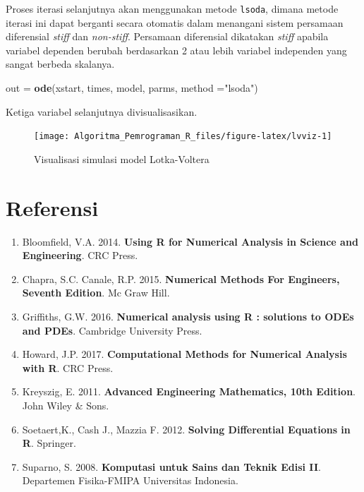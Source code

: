 \documentclass[
]{book}
\newenvironment{Shaded}{\begin{snugshade}}{\end{snugshade}}
\newcommand{\AttributeTok}[1]{\textcolor[rgb]{0.13,0.29,0.53}{#1}}
\newcommand{\FunctionTok}[1]{\textcolor[rgb]{0.13,0.29,0.53}{\textbf{#1}}}
\newcommand{\NormalTok}[1]{#1}
\newcommand{\OtherTok}[1]{\textcolor[rgb]{0.56,0.35,0.01}{#1}}
\newcommand{\StringTok}[1]{\textcolor[rgb]{0.31,0.60,0.02}{#1}}
\providecommand{\tightlist}{%
  \setlength{\itemsep}{0pt}\setlength{\parskip}{0pt}}
\theoremstyle{definition}
\theoremstyle{definition}
\theoremstyle{definition}
\theoremstyle{definition}
\theoremstyle{remark}
\begin{document}
Proses iterasi selanjutnya akan menggunakan metode \texttt{lsoda}, dimana metode iterasi ini dapat berganti secara otomatis dalam menangani sistem persamaan diferensial \emph{stiff} dan \emph{non-stiff}. Persamaan diferensial dikatakan \emph{stiff} apabila variabel dependen berubah berdasarkan 2 atau lebih variabel independen yang sangat berbeda skalanya.

\begin{Shaded}
\begin{Highlighting}[]
\NormalTok{out }\OtherTok{=} \FunctionTok{ode}\NormalTok{(xstart, times, model, parms, }
          \AttributeTok{method =}\StringTok{"lsoda"}\NormalTok{)}
\end{Highlighting}
\end{Shaded}

Ketiga variabel selanjutnya divisualisasikan.

\begin{figure}

{\centering \texttt{[image: Algoritma\_Pemrograman\_R\_files/figure-latex/lvviz-1]} 

}

\caption{Visualisasi simulasi model Lotka-Voltera}\label{fig:lvviz}
\end{figure}

\hypertarget{referensi-5}{%
\section{Referensi}\label{referensi-5}}

\begin{enumerate}
\def\labelenumi{\arabic{enumi}.}
\tightlist
\item
  Bloomfield, V.A. 2014. \textbf{Using R for Numerical Analysis in Science and Engineering}. CRC Press.
\item
  Chapra, S.C. Canale, R.P. 2015. \textbf{Numerical Methods For Engineers, Seventh Edition}. Mc Graw Hill.
\item
  Griffiths, G.W. 2016. \textbf{Numerical analysis using R : solutions to ODEs and PDEs}. Cambridge University Press.
\item
  Howard, J.P. 2017. \textbf{Computational Methods for Numerical Analysis with R}. CRC Press.
\item
  Kreyszig, E. 2011. \textbf{Advanced Engineering Mathematics, 10th Edition}. John Wiley \& Sons.
\item
  Soetaert,K., Cash J., Mazzia F. 2012. \textbf{Solving Differential Equations in R}. Springer.
\item
  Suparno, S. 2008. \textbf{Komputasi untuk Sains dan Teknik Edisi II}. Departemen Fisika-FMIPA Universitas Indonesia.
\end{enumerate}
\end{document}
